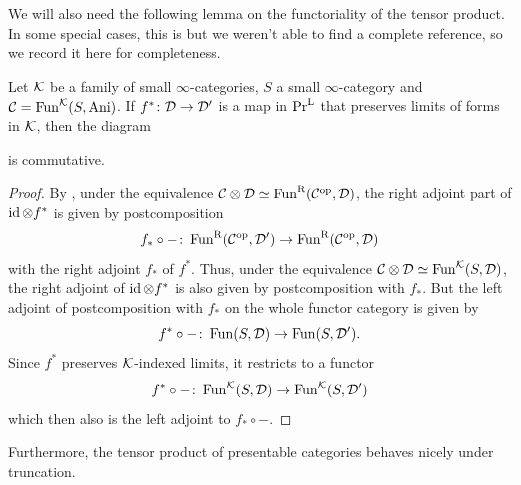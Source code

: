 We will also need the following lemma on the functoriality of the tensor product.
In some special cases, this is \cite[Section 2.2]{Haine2025}
but we weren't able to find a complete reference, so we record it here for completeness.

\begin{lemma}\label{lem:pres-tens-prod-fun}
Let $\mathcal{K}$ be a family of small $\infty$-categories, $S$ a small $\infty$-category and $\mathcal{C} = \operatorname{Fun}^{\mathcal{K}}(S,\mathrm{Ani})$.
If $f^\ast\colon\mathcal{D}\to\mathcal{D}'$ is a map in $\mathrm{Pr}^\mathrm{L}$ that preserves limits of forms in $\mathcal{K}$,
then the diagram
\begin{center}
\end{center}
is commutative.
\end{lemma}

\begin{proof}
By \cite[Remark 071F]{Kerodon2026}, under the equivalence $\mathcal{C}\otimes\mathcal{D}\simeq\operatorname{Fun}^{\mathrm{R}}(\mathcal{C}^{\mathrm{op}},\mathcal{D})$,
the right adjoint part of $\operatorname{id}\otimes f^\ast$ is given by postcomposition
\[
    f_\ast\circ -\colon\operatorname{Fun}^{\mathrm{R}}(\mathcal{C}^{\mathrm{op}},\mathcal{D}')\to\operatorname{Fun}^{\mathrm{R}}(\mathcal{C}^{\mathrm{op}},\mathcal{D})
\]
with the right adjoint $f_\ast$ of $f^\ast$.
Thus, under the equivalence $\mathcal{C}\otimes\mathcal{D}\simeq\operatorname{Fun}^{\mathcal{K}}(S,\mathcal{D})$,
the right adjoint of $\operatorname{id}\otimes f^\ast$ is also given by postcomposition with $f_\ast$.
But the left adjoint of postcomposition with $f_\ast$ on the whole functor category is given by
\[
    f^\ast\circ -\colon\operatorname{Fun}(S,\mathcal{D})\to\operatorname{Fun}(S,\mathcal{D}').
\]
Since $f^\ast$ preserves $\mathcal{K}$-indexed limits, it restricts to a functor
\[
    f^\ast\circ -\colon\operatorname{Fun}^{\mathcal{K}}(S,\mathcal{D})\to\operatorname{Fun}^{\mathcal{K}}(S,\mathcal{D}')
\]
which then also is the left adjoint to $f_\ast\circ -$.
\end{proof}

Furthermore, the tensor product of presentable categories behaves nicely under truncation.

